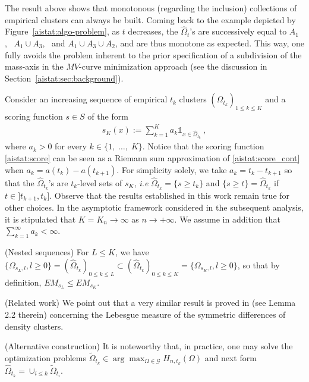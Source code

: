 The result above shows that monotonous (regarding the inclusion) collections of empirical clusters can always be built. Coming back to the example depicted by Figure~\ref{aistat:algo-problem}, as $t$ decreases, the $\hat \Omega_{t}$'s are successively equal to $A_1$,~ $A_1 \cup A_3$,~ and $A_1 \cup A_3 \cup A_2$, and are thus monotone as expected. This way, one fully avoids the problem inherent to the prior specification of a subdivision of the mass-axis in the $MV$-curve minimization approach (see the discussion in Section~\ref{aistat:sec:background}).

Consider an increasing sequence of empirical $t_k$ clusters $(\hat \Omega_{t_k})_{1\leq k\leq K}$ and a scoring function $s \in S$ of the form
\noindent
\begin{align}
\label{aistat:score}
s_K(x):= \sum_{k=1}^K a_k \mathds{1}_{x \in \hat{\Omega}_{t_k} }~,
\end{align}
where $a_k>0$ for every $k\in\{1,\; \ldots,\; K\}$. Notice that the scoring function \eqref{aistat:score} can be seen as a Riemann sum approximation of \eqref{aistat:score_cont} when $a_k=a(t_k)-a(t_{k+1})$. For simplicity solely, we take $a_k=t_{k}-t_{k+1}$ so that the $\hat \Omega_{t_k}$'s  are $t_k$-level sets of $s_K$, \textit{i.e} $\hat \Omega_{t_k}=\{s \ge t_k\}$ and $\{s \ge t\}= \hat \Omega_{t_k}$ if $t \in ]t_{k+1},t_{k}]$. Observe that the results established in this work remain true for other choices. In the asymptotic framework considered in the subsequent analysis, it is stipulated that $K=K_n \rightarrow \infty$ as $n\rightarrow +\infty$. We assume in addition that $\sum_{k=1}^{\infty}a_k < \infty$.
\begin{remark}
\label{aistat:orderscore}{\sc (Nested sequences)}
For $L \le K$, we have $\{\Omega_{s_L,l},l \ge 0\}=(\hat \Omega_{t_k})_{0 \le k \le L } \subset (\hat \Omega_{t_k})_{0 \le k \le K }=\{\Omega_{s_K,l},l \ge 0\}$, so that by definition, $EM_{s_L} \le EM_{s_K}$.   
\end{remark}
\begin{remark}{\sc (Related work)}
  We point out that a very similar result is proved in \cite{Polonik1998} (see Lemma 2.2 therein) concerning the
  Lebesgue measure of the symmetric differences of density clusters.
\end{remark}
\begin{remark}{\sc (Alternative construction)}
\label{aistat:mono}
It is noteworthy that, in practice, one may solve the optimization problems
$\tilde
\Omega_{t_k} \in \arg\max_{\Omega \in \mathcal{G}} H_{n,t_k}(\Omega)$
and  next form  $\hat \Omega_{t_k}= \cup_{i \le k} \tilde \Omega_{t_i}$. 
\end{remark}

